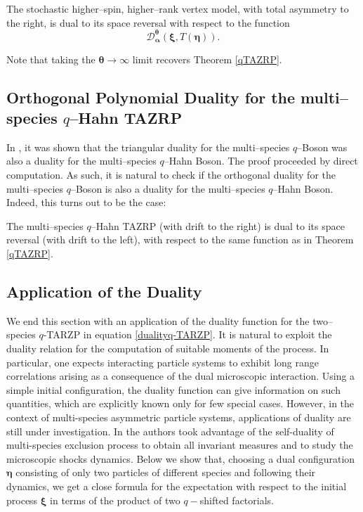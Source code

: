 \documentclass{ximera}
\begin{document}
\begin{theorem}\label{Vertex}
The stochastic higher--spin, higher--rank vertex model, with total asymmetry to the right, is dual to its space reversal with respect to the function
$$
\mathcal{D}_{\boldsymbol{\alpha}}^{\boldsymbol{\theta}}(\boldsymbol{\xi},T(\boldsymbol{\eta})).
$$

\end{theorem}
Note that taking the $\boldsymbol\theta\rightarrow\infty$ limit recovers Theorem \ref{qTAZRP}.

\subsection{Orthogonal Polynomial Duality for the multi--species $q$--Hahn TAZRP}
In \cite{KuanCMP}, it was shown that the triangular duality for the multi--species $q$--Boson was also a duality for the multi--species $q$--Hahn Boson. The proof proceeded by direct computation. As such, it is natural to check if the orthogonal duality for the multi--species $q$--Boson is also a duality for the multi--species $q$--Hahn Boson. Indeed, this turns out to be the case:
\begin{theorem}\label{qHahn}
The multi--species $q$--Hahn TAZRP (with drift to the right) is dual to its space reversal (with drift to the left), with respect to the same function as in Theorem \ref{qTAZRP}.

\end{theorem}
\subsection{Application of the Duality}
We end this section with an application of the duality function for the two--species $q$-TARZP in equation \eqref{dualityq-TARZP}. It is natural to exploit the duality relation for the computation of suitable moments of the process. In particular, one expects interacting particle systems to exhibit long range correlations arising as a consequence of the dual microscopic interaction. Using a simple initial configuration, the duality function can give information on such quantities, which are explicitly known only for few special cases. However, in the context of multi-species asymmetric particle systems, applications of duality are still under investigation. In \cite{BS3} the authors took advantage of the self-duality of multi-species exclusion process to obtain all invariant measures and to study the microscopic shocks dynamics. Below we show that, choosing a dual configuration $\boldsymbol{\eta}$ consisting of only two particles of different species and following their dynamics, we get a close formula for the expectation with respect to the initial process $\boldsymbol{\xi}$ in terms of the product of two $q-$shifted factorials.
\end{document}
